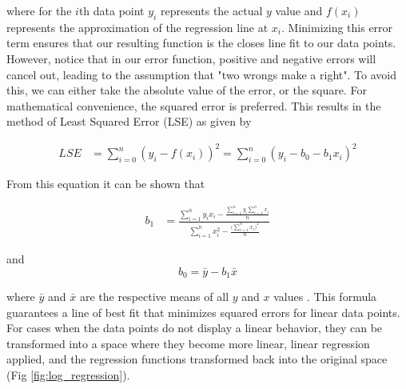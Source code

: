 where for the $i$th data point $y_i$ represents the actual $y$ value and $f(x_i)$ represents the approximation of the regression line at $x_i$. Minimizing this error term ensures that our resulting function is the closes line fit to our data points. However, notice that in our error function, positive and negative errors will cancel out, leading to the assumption that "two wrongs make a right". To avoid this, we can either take the absolute value of the error, or the square. For mathematical convenience, the squared error is preferred. This results in the method of Least Squared Error (LSE) as given by

\begin{align}
\label{eq:least_square}
LSE &= \sum_{i=0}^n (y_i-f(x_i))^2  = \sum_{i=0}^n (y_i- b_0 - b_1x_i)^2
\end{align}

From this equation it can be shown that 

\begin{align}
b_1 &= \frac{\sum_{i=1}^n y_ix_i - \frac{\sum_{i=1}^n y_i \sum_{i=1}^n x_i}{n}}{\sum_{i=1}^n x_i^2 - \frac{\Big(\sum_{i=1}^n x_i \Big)^2}{n}}
\end{align}

and 
$$ b_0 = \bar y - b_1 \bar x $$

where $\bar y$ and $\bar x$ are the respective means of all $y$ and $x$ values \cite{Finney1996}. This formula guarantees a line of best fit that minimizes squared errors for linear data points. For cases when the data points do not display a linear behavior, they can be transformed into a space where they become more linear, linear regression applied, and the regression functions transformed back into the original space (Fig \ref{fig:log_regression}).

